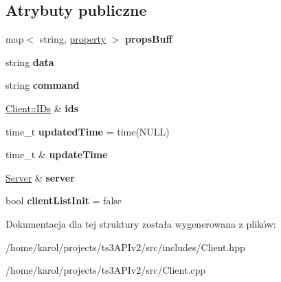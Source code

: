 \subsection*{Atrybuty publiczne}
\begin{DoxyCompactItemize}
\item 
map$<$ string, \hyperlink{struct_ts3_api_1_1_client_1_1property}{property} $>$ {\bfseries props\+Buff}\hypertarget{struct_ts3_api_1_1_client_1_1properties_aeb8e241cdabdc4977a1b0302cb44652c}{}\label{struct_ts3_api_1_1_client_1_1properties_aeb8e241cdabdc4977a1b0302cb44652c}

\item 
string {\bfseries data}\hypertarget{struct_ts3_api_1_1_client_1_1properties_ae945600450c7135b6112497e301f05fe}{}\label{struct_ts3_api_1_1_client_1_1properties_ae945600450c7135b6112497e301f05fe}

\item 
string {\bfseries command}\hypertarget{struct_ts3_api_1_1_client_1_1properties_a064a0531a9e95ad23ce24cd20541119e}{}\label{struct_ts3_api_1_1_client_1_1properties_a064a0531a9e95ad23ce24cd20541119e}

\item 
\hyperlink{struct_ts3_api_1_1_client_1_1_i_ds}{Client\+::\+I\+Ds} \& {\bfseries ids}\hypertarget{struct_ts3_api_1_1_client_1_1properties_a5021b04094108cd1bd5633b18afa7913}{}\label{struct_ts3_api_1_1_client_1_1properties_a5021b04094108cd1bd5633b18afa7913}

\item 
time\+\_\+t {\bfseries updated\+Time} = time(N\+U\+LL)\hypertarget{struct_ts3_api_1_1_client_1_1properties_ad3e5944fd62b261814e2d0b700c07fc4}{}\label{struct_ts3_api_1_1_client_1_1properties_ad3e5944fd62b261814e2d0b700c07fc4}

\item 
time\+\_\+t \& {\bfseries update\+Time}\hypertarget{struct_ts3_api_1_1_client_1_1properties_a7224c86d437b746fea116ebd51b730a4}{}\label{struct_ts3_api_1_1_client_1_1properties_a7224c86d437b746fea116ebd51b730a4}

\item 
\hyperlink{class_ts3_api_1_1_server}{Server} \& {\bfseries server}\hypertarget{struct_ts3_api_1_1_client_1_1properties_a11877c40d90aa424f0193ad63e505593}{}\label{struct_ts3_api_1_1_client_1_1properties_a11877c40d90aa424f0193ad63e505593}

\item 
bool {\bfseries client\+List\+Init} = false\hypertarget{struct_ts3_api_1_1_client_1_1properties_aca3d28b26aae9b2dba70973beb38f0c7}{}\label{struct_ts3_api_1_1_client_1_1properties_aca3d28b26aae9b2dba70973beb38f0c7}

\end{DoxyCompactItemize}


Dokumentacja dla tej struktury została wygenerowana z plików\+:\begin{DoxyCompactItemize}
\item 
/home/karol/projects/ts3\+A\+P\+Iv2/src/includes/Client.\+hpp\item 
/home/karol/projects/ts3\+A\+P\+Iv2/src/Client.\+cpp\end{DoxyCompactItemize}
